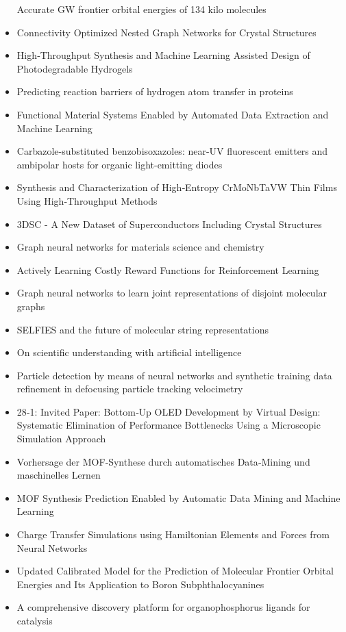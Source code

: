 \documentclass{article}%
\begin{document}
\begin{itemize}
Accurate GW frontier orbital energies of 134 kilo molecules%
\item%
Connectivity Optimized Nested Graph Networks for Crystal Structures%
\item%
High‐Throughput Synthesis and Machine Learning Assisted Design of Photodegradable Hydrogels%
\item%
Predicting reaction barriers of hydrogen atom transfer in proteins%
\item%
Functional Material Systems Enabled by Automated Data Extraction and Machine Learning%
\item%
Carbazole{-}substituted benzobisoxazoles: near{-}UV fluorescent emitters and ambipolar hosts for organic light{-}emitting diodes%
\item%
Synthesis and Characterization of High‐Entropy CrMoNbTaVW Thin Films Using High‐Throughput Methods%
\item%
3DSC {-} A New Dataset of Superconductors Including Crystal Structures%
\item%
Graph neural networks for materials science and chemistry%
\item%
Actively Learning Costly Reward Functions for Reinforcement Learning%
\item%
Graph neural networks to learn joint representations of disjoint molecular graphs%
\item%
SELFIES and the future of molecular string representations%
\item%
On scientific understanding with artificial intelligence%
\item%
Particle detection by means of neural networks and synthetic training data refinement in defocusing particle tracking velocimetry%
\item%
28‐1: Invited Paper: Bottom‐Up OLED Development by Virtual Design: Systematic Elimination of Performance Bottlenecks Using a Microscopic Simulation Approach%
\item%
Vorhersage der MOF‐Synthese durch automatisches Data‐Mining und maschinelles Lernen%
\item%
MOF Synthesis Prediction Enabled by Automatic Data Mining and Machine Learning%
\item%
Charge Transfer Simulations using Hamiltonian Elements and Forces from Neural Networks%
\item%
Updated Calibrated Model for the Prediction of Molecular Frontier Orbital Energies and Its Application to Boron Subphthalocyanines%
\item%
A comprehensive discovery platform for organophosphorus ligands for catalysis%

\end{itemize}
\end{document}
